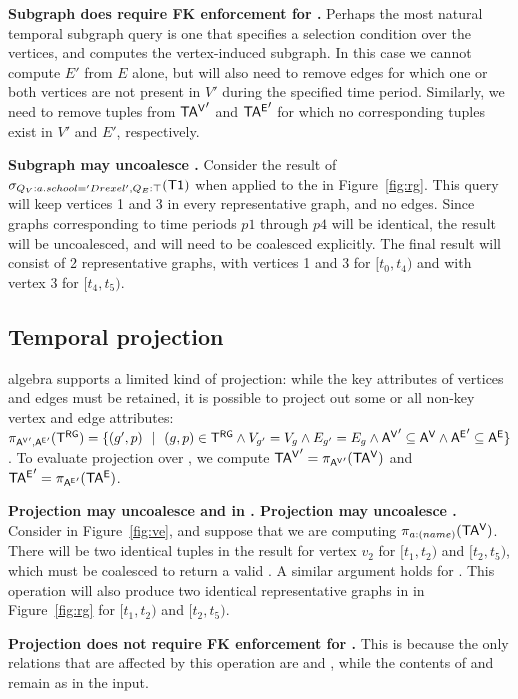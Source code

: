 {\bf Subgraph does require FK enforcement for \tve.}  Perhaps the most
natural temporal subgraph query is one that specifies a selection
condition over the vertices, and computes the vertex-induced subgraph.
In this case we cannot compute $E'$ from $E$ alone, but will also need
to remove edges for which one or both vertices are not present in $V'$
during the specified time period.  Similarly, we need to remove tuples
from $\mathsf{TA^{V}}'$ and $\mathsf{TA^{E}}'$ for which no corresponding tuples exist in
$V'$ and $E'$, respectively.

{\bf Subgraph may uncoalesce \trg.} Consider the result of
$\sigma_{Q_V:{a.school='Drexel'},Q_E:\top} (\textsf{T1})$ when
applied to the \tg in Figure~\ref{fig:rg}.  This query will keep
vertices 1 and 3 in every representative graph, and no edges.  Since
graphs corresponding to time periods $p1$ through $p4$ will be
identical, the result will be uncoalesced, and will need to be
coalesced explicitly.  The final result will consist of 2
representative graphs, with vertices 1 and 3 for $[t_0, t_4)$ and with
  vertex 3 for $[t_4, t_5)$.

\subsection{Temporal projection}
\label{sec:algebra:project}

\tg algebra supports a limited kind of projection: while the key
attributes of vertices and edges must be retained, it is possible to
project out some or all non-key vertex and edge attributes:
$\pi_{\mathsf{A^{V}}',\mathsf{A^{E}}'} (\mathsf{T^{RG}}) = \{ (g', p)~~|~~(g, p) \in \mathsf{T^{RG}} \wedge
V_{g'} = V_{g} \wedge E_{g'} = E_{g} \wedge \mathsf{A^{V}}' \subseteq \mathsf{A^{V}}
\wedge \mathsf{A^{E}}' \subseteq \mathsf{A^{E}} \}$.  To evaluate projection over \tve, we
compute $\mathsf{TA^{V}}' = \pi_{\mathsf{A^{V}}'} (\mathsf{TA^{V}})$ and $\mathsf{TA^{E}}' = \pi_{\mathsf{A^{E}}'} (\mathsf{TA^{E}})$.

{\bf Projection may uncoalesce \tav and \tae in \tve.  Projection may
  uncoalesce \trg.} Consider  in Figure~\ref{fig:ve}, and
suppose that we are computing $\pi_{a:(name)} (\mathsf{TA^{V}})$.  There will be
two identical tuples in the result for vertex $v_2$ for $[t_1, t_2)$
  and $[t_2, t_5)$, which must be coalesced to return a valid \tav.  A
    similar argument holds for \tae. This operation will also produce
    two identical representative graphs in \trg in Figure~\ref{fig:rg}
    for $[t_1, t_2)$ and $[t_2, t_5)$.

{\bf Projection does not require FK enforcement for \tve.}  This is
because the only relations that are affected by this operation are
\tav and \tae, while the contents of \tv and \te remain as in the
input.

